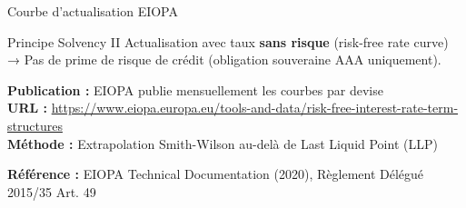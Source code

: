 \documentclass[10pt,aspectratio=169]{beamer}
\newcommand{\highlight}[1]{\textbf{\color{rougeactu}#1}}
\begin{document}
\begin{frame}{Courbe d'actualisation EIOPA}
\begin{block}{Principe Solvency II}
Actualisation avec taux \highlight{sans risque} (risk-free rate curve) → Pas de prime de risque de crédit (obligation souveraine AAA uniquement).
\end{block}

\begin{center}
\end{center}

\textbf{Publication :} EIOPA publie mensuellement les courbes par devise\\
\textbf{URL :} \url{https://www.eiopa.europa.eu/tools-and-data/risk-free-interest-rate-term-structures}\\
\textbf{Méthode :} Extrapolation Smith-Wilson au-delà de Last Liquid Point (LLP)

\textbf{Référence :} EIOPA Technical Documentation (2020), Règlement Délégué 2015/35 Art. 49
\end{frame}
\end{document}
